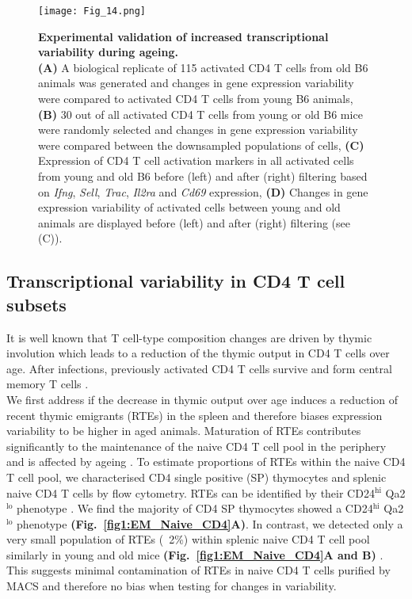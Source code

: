 \newpage

\begin{figure}[!ht]
\centering
\texttt{[image: Fig\_14.png]}
\caption[Experimental validation of increased transcriptional variability during ageing]{\textbf{Experimental validation of increased transcriptional variability during ageing.} \\
\textbf{(A)} A biological replicate of 115 activated CD4\plus{} T cells from old B6 animals was generated and changes in gene expression variability were compared to activated CD4\plus{} T cells from young B6 animals, \textbf{(B)} 30 out of all activated CD4\plus{} T cells from young or old B6 mice were randomly selected and changes in gene expression variability were compared between the downsampled populations of cells, \textbf{(C)} Expression of CD4\plus{} T cell activation markers in all activated cells from young and old B6 before (left) and after (right) filtering based on \textit{Ifng}, \textit{Sell}, \textit{Trac}, \textit{Il2ra} and \textit{Cd69} expression, \textbf{(D)} Changes in gene expression variability of activated cells between young and old animals are displayed before (left) and after (right) filtering (see (C)).}
\label{fig1:validation}
\end{figure}

\newpage

\subsection{Transcriptional variability in CD4\plus{} T cell subsets}

It is well known that T cell-type composition changes are driven by thymic involution which leads to a reduction of the thymic output in CD4\plus{} T cells over age. After infections, previously activated CD4\plus{} T cells survive and form central memory T cells \cite{Moro-Garcia2013}.\\

We first address if the decrease in thymic output over age induces a reduction of recent thymic emigrants (RTEs) in the spleen and therefore biases expression variability to be higher in aged animals. Maturation of RTEs contributes significantly to the maintenance of the naive CD4\plus{} T cell pool in the periphery and is affected by ageing \citep{Boursalian2004, Hale2006, Fink2013}. To estimate proportions of RTEs within the naive CD4\plus{} T cell pool, we characterised CD4 single positive (SP) thymocytes and splenic naive CD4\plus{} T cells by flow cytometry.  RTEs can be identified by their CD24$^{\text{hi}}$ Qa2$^{\text{lo}}$ phenotype \citep{Boursalian2004, Hale2006}. We find the  majority of CD4 SP thymocytes showed a CD24$^\text{hi}$ Qa2$^\text{lo}$ phenotype \textbf{(Fig.~\ref{fig1:EM_Naive_CD4}A)}. In contrast, we detected only a very small population of RTEs (~2\%) within splenic naive CD4\plus{} T cell pool similarly in young and old mice \textbf{(Fig.~\ref{fig1:EM_Naive_CD4}A and B)} \citep{Hale2006}. This suggests minimal contamination of RTEs in naive CD4\plus{} T cells purified by MACS and therefore no bias when testing for changes in variability.\\


